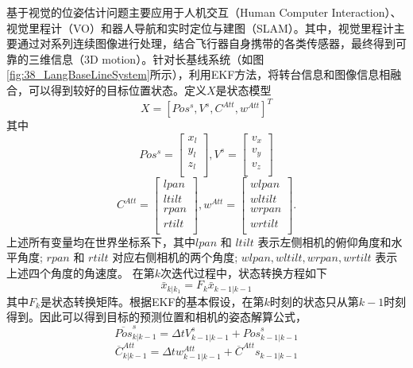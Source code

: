 基于视觉的位姿估计问题主要应用于人机交互（Human Computer Interaction）、视觉里程计（VO）和器人导航和实时定位与建图（SLAM）。其中，视觉里程计主要通过对系列连续图像进行处理，结合飞行器自身携带的各类传感器，最终得到可靠的三维信息（3D motion）。针对长基线系统（如图\ref{fig:38_LangBaseLineSystem}所示），利用EKF方法，将转台信息和图像信息相融合，可以得到较好的目标位置状态。定义$X$是状态模型
\begin{equation}
X=[Pos^s, V^s, C^{Att}, w^{Att}]^T
\end{equation}
其中
$$
Pos^s=\left[\begin{array}{c}
x_l\\
y_l\\
z_l\\
\end{array}\right],
V^s=\left[\begin{array}{c}
v_x\\
v_y\\
v_z\\
\end{array}\right]
$$
$$
C^{Att}=\left[\begin{array}{c}
lpan\\
ltilt\\
rpan\\
rtilt\\
\end{array}\right],
w^{Att}=\left[\begin{array}{c}
wlpan\\
wltilt\\
wrpan\\
wrtilt\\
\end{array}\right].
$$
上述所有变量均在世界坐标系下，其中$lpan$ 和 $ltilt$ 表示左侧相机的俯仰角度和水平角度; $rpan$ 和 $rtilt$ 对应右侧相机的两个角度; $wlpan, wltilt, wrpan, wrtilt$ 表示上述四个角度的角速度。
在第$k$次迭代过程中，状态转换方程如下
\begin{equation}
\bar{x}_{k|k_1}=F_k\bar{x}_{k-1|k-1}
\end{equation}
其中$F_k$是状态转换矩阵。根据EKF的基本假设，在第$k$时刻的状态只从第$k-1$时刻得到。因此可以得到目标的预测位置和相机的姿态解算公式，
\begin{equation}
\overline{Pos}^s_{k|k-1}=\Delta t V^s_{k-1|k-1} + {Pos}^s_{k-1|k-1}
\end{equation}
\begin{equation}
\overline{C}^{Att}_{k|k-1}=\Delta t w^{Att}_{k-1|k-1} + \overline{C}^{Att}s_{k-1|k-1}
\end{equation}
